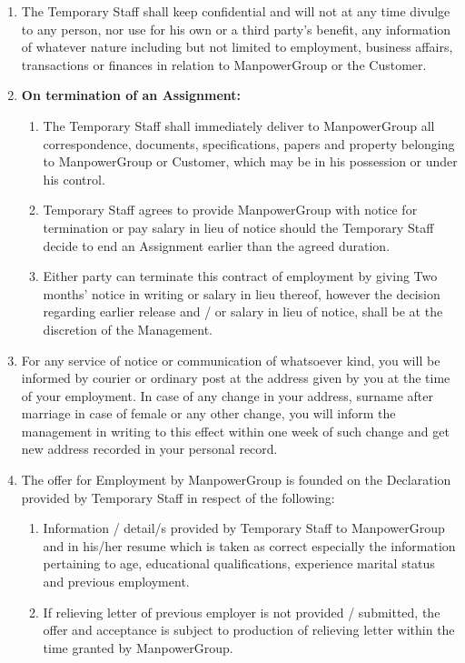 \documentclass[10pt,a4paper]{article}
\begin{document}
\begin{enumerate}[leftmargin=*, label=\textbf{\arabic*.}, itemsep=4pt, start=11]

\item The Temporary Staff shall keep confidential and will not at any time divulge to any person, nor use
for his own or a third party's benefit, any information of whatever nature including but not limited to
employment, business affairs, transactions or finances in relation to ManpowerGroup or the
Customer.

\item \textbf{On termination of an Assignment:}
\begin{enumerate}[label=\textbf{(\alph*)}, itemsep=3pt, topsep=2pt]
  \item The Temporary Staff shall immediately deliver to ManpowerGroup all correspondence,
        documents, specifications, papers and property belonging to ManpowerGroup or Customer,
        which may be in his possession or under his control.
  \item Temporary Staff agrees to provide ManpowerGroup with notice for termination or pay salary
        in lieu of notice should the Temporary Staff decide to end an Assignment earlier than the agreed
        duration.
  \item Either party can terminate this contract of employment by giving Two months’ 
        notice in writing or salary in lieu thereof, however the decision regarding earlier release and / or salary in lieu of notice, 
        shall be at the discretion of the Management.
\end{enumerate}

\vspace{0.2cm}

\item For any service of notice or communication of whatsoever kind, you will be informed by courier or
ordinary post at the address given by you at the time of your employment. In case of any change in
your address, surname after marriage in case of female or any other change, you will inform the
management in writing to this effect within one week of such change and get new address
recorded in your personal record.

\item The offer for Employment by ManpowerGroup is founded on the Declaration provided by
Temporary Staff in respect of the following:
\begin{enumerate}[label=\textbf{(\alph*)}, itemsep=3pt, topsep=2pt]
  \item Information / detail/s provided by Temporary Staff to ManpowerGroup and in his/her resume
        which is taken as correct especially the information pertaining to age, educational qualifications,
        experience marital status and previous employment.
  \item If relieving letter of previous employer is not provided / submitted, the offer and acceptance is
        subject to production of relieving letter within the time granted by ManpowerGroup.
\end{enumerate}


\end{enumerate}
\end{document}
